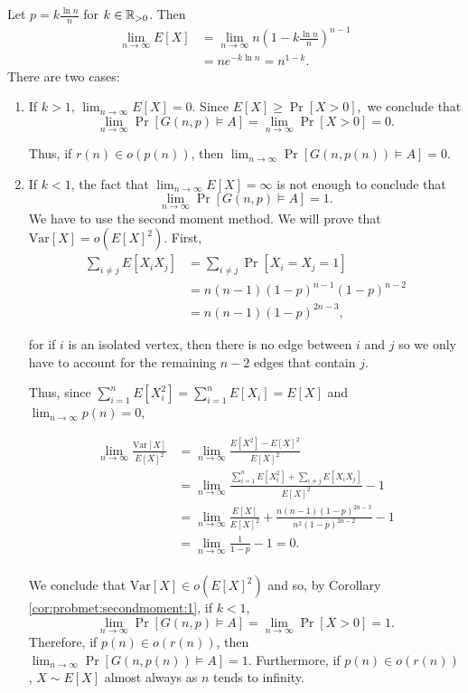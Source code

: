Let $\displaystyle{p = k\frac{\ln n}{n}}$ for $k \in \mathbb{R}_{>0}$. Then
\begin{align*}
    \lim_{n \to \infty} E[X] &= \lim_{n \to \infty} n\left(1 - k\frac{\ln n}{n}\right)^{n - 1} \\
    &= ne^{-k\ln n} = n^{1 - k}.
\end{align*}
There are two cases: \par
\begin{enumerate}
    \item If $k > 1$, $\lim_{n \to \infty} E[X] = 0$. Since \(E[X] \geq \Pr[X > 0],\) we conclude that \[\lim_{n \to \infty} \Pr[G(n, p) \vDash A] =  \lim_{n \to \infty} \Pr[X > 0] = 0.\] \par
    Thus, if $r(n) \in o(p(n))$, then $\lim_{n \to \infty} \Pr[G(n, p(n)) \vDash A] = 0$. \par
    \item If $k < 1$, the fact that $\lim_{n \to \infty} E[X] = \infty$ is not enough to conclude that \[\lim_{n \to \infty} \Pr[G(n, p) \vDash A] = 1.\] 
    We have to use the second moment method.  We will prove that $\text{Var} [X] = o(E[X]^2)$. First, 
    \begin{align*}
        \sum_{i \neq j}E[X_iX_j] &= \sum_{i \neq j} \Pr[X_i = X_j = 1] \\
        &= n(n - 1)(1 - p)^{n -1}(1 - p)^{n - 2} \\ &= n(n - 1)(1 - p)^{2n - 3},
    \end{align*}
    
    for if $i$ is an isolated vertex, then there is no edge between $i$ and $j$ so we only have to account for the remaining $n - 2$ edges that contain $j$.  \par
    
    Thus, since $\sum_{i = 1}^{n}E[X_i^2] =  \sum_{i = 1}^n E[X_i] = E[X]$ and $\lim_{n \to \infty} p(n) = 0$,
    
    \begin{align*}
        \lim_{n \to \infty} \frac{\text{Var}[X]}{E[X]^2} &= 
        \lim_{n \to \infty}\frac{E[X^2] - E[X]^2}{E[X]^2} \\
        &= \lim_{n \to \infty} \frac{\sum_{i = 1}^n E[X_i^2] + \sum_{i \neq j}E[X_iX_j]}{E[X]^2} - 1 \\ &= \lim_{n \to \infty} \frac{E[X]}{E[X]^2} +\frac{ n(n - 1)(1 - p)^{2n - 3}}{n^2(1 - p)^{2n - 2}} - 1 \\
        & = \lim_{n \to \infty} \frac{1}{1 - p} - 1 = 0.\\
    \end{align*} \par
    We conclude that $\text{Var}[X] \in o(E[X]^2)$ and so, by Corollary \ref{cor:probmet:secondmoment:1}, if $k < 1$, 
    \[\lim_{n \to \infty} \Pr[G(n, p) \vDash A] = \lim_{n \to \infty} \Pr[X > 0] = 1.\] 
    Therefore, if $p(n) \in o(r(n))$, then $\lim_{n \to \infty} \Pr[G(n, p(n)) \vDash A] = 1$. Furthermore, if $p(n) \in o(r(n))$, $X \sim E[X]$ almost always as $n$ tends to infinity.  \par
\end{enumerate}
